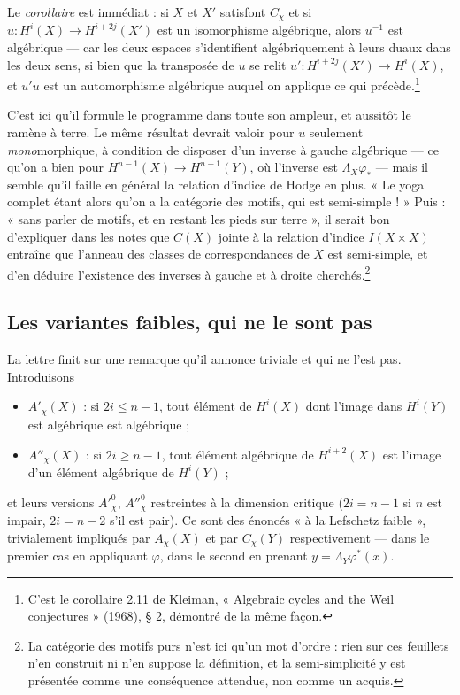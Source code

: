 \documentclass[11pt,a4paper]{article}
\begin{document}
Le \emph{corollaire} est immédiat : si $X$ et $X'$ satisfont $C_{\chi}$ et si
$u \colon H^{i}(X) \to H^{i+2j}(X')$ est un isomorphisme algébrique, alors
$u^{-1}$ est algébrique --- car les deux espaces s'identifient algébriquement
à leurs duaux dans les deux sens, si bien que la transposée de $u$ se relit
$u' \colon H^{i+2j}(X') \to H^{i}(X)$, et $u'u$ est un automorphisme
algébrique auquel on applique ce qui précède.\footnote{C'est le corollaire
2.11 de Kleiman, « Algebraic cycles and the Weil conjectures » (1968), § 2,
démontré de la même façon.}

C'est ici qu'il formule le programme dans toute son ampleur, et aussitôt le
ramène à terre. Le même résultat devrait valoir pour $u$ seulement
\emph{mono}morphique, à condition de disposer d'un inverse à gauche algébrique
--- ce qu'on a bien pour $H^{n-1}(X) \to H^{n-1}(Y)$, où l'inverse est
$\Lambda_{X}\varphi_{*}$ --- mais il semble qu'il faille en général la relation
d'indice de Hodge en plus. « Le yoga complet étant alors qu'on a la catégorie
des motifs, qui est semi-simple ! » Puis : « sans parler de motifs, et en
restant les pieds sur terre », il serait bon d'expliquer dans les notes que
$C(X)$ jointe à la relation d'indice $I(X \times X)$ entraîne que l'anneau des
classes de correspondances de $X$ est semi-simple, et d'en déduire l'existence
des inverses à gauche et à droite cherchés.\footnote{La catégorie des motifs
purs n'est ici qu'un mot d'ordre : rien sur ces feuillets n'en construit ni
n'en suppose la définition, et la semi-simplicité y est présentée comme une
conséquence attendue, non comme un acquis.}

\subsection*{Les variantes faibles, qui ne le sont pas}

La lettre finit sur une remarque qu'il annonce triviale et qui ne l'est pas.
Introduisons
\begin{itemize}
  \item $A'_{\chi}(X)$ : si $2i \leqslant n-1$, tout élément de $H^{i}(X)$ dont
  l'image dans $H^{i}(Y)$ est algébrique est algébrique ;
  \item $A''_{\chi}(X)$ : si $2i \geqslant n-1$, tout élément algébrique de
  $H^{i+2}(X)$ est l'image d'un élément algébrique de $H^{i}(Y)$ ;
\end{itemize}
et leurs versions $A'^{0}_{\chi}$, $A''^{0}_{\chi}$ restreintes à la dimension
critique ($2i = n-1$ si $n$ est impair, $2i = n-2$ s'il est pair). Ce sont des
énoncés « à la Lefschetz faible », trivialement impliqués par $A_{\chi}(X)$
et par $C_{\chi}(Y)$ respectivement --- dans le premier cas en appliquant
$\varphi$, dans le second en prenant $y = \Lambda_{Y}\varphi^{*}(x)$.
\end{document}
